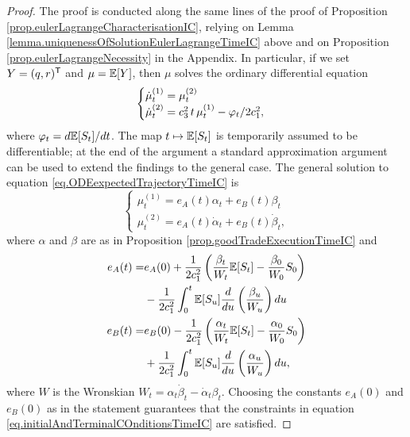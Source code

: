 \documentclass[10pt,a4paper]{article}
\begin{document}
\begin{proof}
The proof is conducted along the same lines of the proof of Proposition \ref{prop.eulerLagrangeCharacterisationIC}, relying  on Lemma \ref{lemma.uniquenessOfSolutionEulerLagrangeTimeIC} above and on Proposition \ref{prop.eulerLagrangeNecessity} in the Appendix. In particular, if we set $Y=(q,r)^{\mathsf{T}}$ and $\mu=\mathbb{{E}}[Y]$, then $\mu$ solves the ordinary differential equation 
\begin{equation}\label{eq.ODEexpectedTrajectoryTimeIC}
\begin{cases}
\dot{\mu}^{(1)}_t = \mu^{(2)}_t \\
\dot{\mu}^{(2)}_t = c_{3}^{2} \, t \, \mu^{(1)}_t - \varphi_t/2c_{1}^{2},
\end{cases}
\end{equation}
where $\varphi_t=d\mathbb{{E}}[S_t]/dt$. The map $t\mapsto \mathbb{{E}}[S_t]$ is temporarily assumed to be differentiable; at the end of the argument a standard approximation argument can be used to extend the findings to the general case. The general solution to equation \eqref{eq.ODEexpectedTrajectoryTimeIC} is 
\begin{equation*}
\begin{cases}
\mu^{(1)}_t = e_A (t)\alpha_t + e_B(t)\beta_t \\
\mu^{(2)}_t = e_A(t)\dot{\alpha}_t + e_B(t)\dot{\beta}_t,
\end{cases}
\end{equation*}
where $\alpha$ and $\beta$ are as in Proposition \ref{prop.goodTradeExecutionTimeIC} and
\begin{equation*}
\begin{split}
e_A(t) = & 
e_A(0) + \frac{1}{2c_{1}^{2}} \left(\frac{\beta_t}{W_t} \mathbb{{E}}[S_t] - \frac{\beta_0}{W_0}S_0\right) \\
& -\frac{1}{2c_{1}^{2}}\int_{0}^{t} \mathbb{{E}}[S_u]\frac{d}{du}\left(\frac{\beta_u}{W_u}\right)du\\
e_B(t) = & 
e_B(0) - \frac{1}{2c_{1}^{2}} \left(\frac{\alpha_t}{W_t} \mathbb{{E}}[S_t] - \frac{\alpha_0}{W_0}S_0\right) \\
& +\frac{1}{2c_{1}^{2}}\int_{0}^{t} \mathbb{{E}}[S_u]\frac{d}{du}\left(\frac{\alpha_u}{W_u}\right)du,
\end{split}
\end{equation*}
where $W$ is the Wronskian $W_t = \alpha_t\dot{\beta}_t - \dot{\alpha}_t \beta_t$. Choosing the constants $e_A(0)$ and $e_B(0)$ as in the statement guarantees that the constraints in equation \eqref{eq.initialAndTerminalCOnditionsTimeIC} are satisfied. 
\end{proof}
\end{document}
